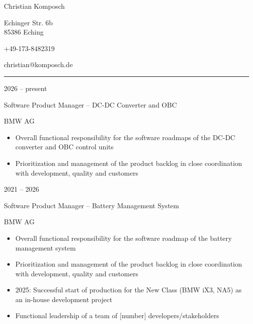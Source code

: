 \documentclass[a4paper,10pt]{article}
\newlength{\cvcolumngapwidth}
\newlength{\cvleftcolumnwidth}
\newlength{\cvrightcolumnwidth}
\newcommand{\cvnamestyle}[1]{{\Large\cvnamefont\textcolor{cvnamecolor}{#1}}}
\newcommand{\cvsectionstyle}[1]{{\normalsize\cvsectionfont\textcolor{cvsectioncolor}{#1}}}
\newcommand{\cvtitlestyle}[1]{{\large\cvtitlefont\textcolor{cvtitlecolor}{#1}}}
\newcommand{\cvdurationstyle}[1]{{\small\cvdurationfont\textcolor{cvdurationcolor}{#1}}}
\newlength{\cvafteritemskipamount}
\newlength{\cvaftersectionskipamount}
\newlength{\cvafternameskipamount}
\newlength{\cvafterpersonalinfolineskipamount}
\newlength{\cvaftertitleskipamount}
\newlength{\cvparskip}
\newcommand{\cvpersonalinfo}[2]{
    \begin{minipage}[t]{\cvleftcolumnwidth}
        \vspace{0mm}
        \raggedleft #1
    \end{minipage}%
    \hspace{\cvcolumngapwidth}%
    \begin{minipage}[t]{\cvrightcolumnwidth}
        \vspace{0mm}
        #2
    \end{minipage}
    \vspace{\cvafteritemskipamount}
}
\newcommand{\cvname}[1]{
    \cvnamestyle{#1}
    \vspace{\cvafternameskipamount}
}
\newcommand{\cvsection}[1]{
    \begin{minipage}[t]{\cvleftcolumnwidth}
        \raggedleft\cvsectionstyle{#1}
    \end{minipage}%
    \hspace{\cvcolumngapwidth}%
    \begin{minipage}[t]{\cvrightcolumnwidth}
        \textcolor{cvrulecolor}{\rule{\cvrightcolumnwidth}{0.3mm}}
    \end{minipage}
    \vspace{\cvaftersectionskipamount}
}
\newcommand{\cvitem}[2]{
    \begin{minipage}[t]{\cvleftcolumnwidth}
        \raggedleft #1
    \end{minipage}%
    \hspace{\cvcolumngapwidth}%
    \begin{minipage}[t]{\cvrightcolumnwidth}
        \setlength{\parskip}{\cvparskip} #2
    \end{minipage}
    \vspace{\cvafteritemskipamount}
}
\newcommand{\cvtitle}[1]{
    \cvtitlestyle{#1}
    \vspace{\cvaftertitleskipamount}
    \vspace{-\cvparskip}
}
\begin{document}
\cvpersonalinfo{
}{
    \cvname{Christian Komposch}

    Echinger Str. 6b\\
    85386 Eching
    \vspace{\cvafterpersonalinfolineskipamount}

    +49-173-8482319
    \vspace{\cvafterpersonalinfolineskipamount}

    christian@komposch.de
}

\cvsection{PROFESSIONAL EXPERIENCE}

\cvitem{
    \cvdurationstyle{2026 -- present}
}{
    \cvtitle{Software Product Manager -- DC-DC Converter and OBC}

    BMW AG

    \begin{itemize}[leftmargin=*]
        \item Overall functional responsibility for the software roadmaps of the DC-DC converter and OBC control units
        \item Prioritization and management of the product backlog in close coordination with development, quality and customers
    \end{itemize}
}

\cvitem{
    \cvdurationstyle{2021 -- 2026}
}{
    \cvtitle{Software Product Manager -- Battery Management System}

    BMW AG

    \begin{itemize}[leftmargin=*]
        \item Overall functional responsibility for the software roadmap of the battery management system
        \item Prioritization and management of the product backlog in close coordination with development, quality and customers
        \item 2025: Successful start of production for the New Class (BMW iX3, NA5) as an in-house development project
        \item %
              Functional leadership of a team of [number] developers/stakeholders
    \end{itemize}
}
\end{document}
